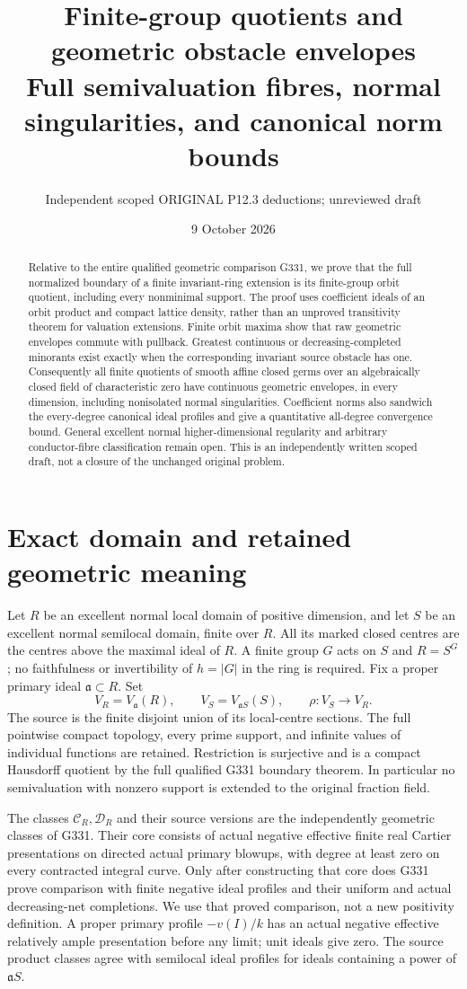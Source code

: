 \documentclass[11pt]{article}
\title{Finite-group quotients and geometric obstacle envelopes\\
Full semivaluation fibres, normal singularities, and canonical norm bounds}
\author{Independent scoped ORIGINAL P12.3 deductions; unreviewed draft}
\date{9 October 2026}
\newcommand{\C}{\mathcal C}
\newcommand{\D}{\mathcal D}
\newcommand{\aideal}{\mathfrak a}
\begin{document}
\maketitle
\begin{abstract}
Relative to the entire qualified geometric comparison G331, we prove
that the full normalized boundary of a finite invariant-ring extension
is its finite-group orbit quotient, including every nonminimal support.
The proof uses coefficient ideals of an orbit product and compact lattice
density, rather than an unproved transitivity theorem for valuation
extensions. Finite orbit maxima show that raw geometric envelopes commute
with pullback. Greatest continuous or decreasing-completed minorants exist
exactly when the corresponding invariant source obstacle has one.
Consequently all finite quotients of smooth affine closed germs over an
algebraically closed field of characteristic zero have continuous geometric
envelopes, in every dimension, including nonisolated normal singularities.
Coefficient norms also sandwich the every-degree canonical ideal profiles
and give a quantitative all-degree convergence bound. General excellent
normal higher-dimensional regularity and arbitrary conductor-fibre
classification remain open. This is an independently written scoped draft,
not a closure of the unchanged original problem.
\end{abstract}

\section{Exact domain and retained geometric meaning}
Let $R$ be an excellent normal local domain of positive dimension, and
let $S$ be an excellent normal semilocal domain, finite over $R$.
All its marked closed centres are the centres above the maximal ideal
of $R$. A finite group $G$ acts on $S$ and $R=S^G$; no faithfulness
or invertibility of $h=|G|$ in the ring is required. Fix a proper primary
ideal $\aideal\subset R$. Set
\[
 V_R=V_{\aideal}(R),\qquad V_S=V_{\aideal S}(S),\qquad
 \rho:V_S\longrightarrow V_R.
\]
The source is the finite disjoint union of its local-centre sections.
The full pointwise compact topology, every prime support, and infinite
values of individual functions are retained. Restriction is surjective
and is a compact Hausdorff quotient by the full qualified G331 boundary
theorem. In particular no semivaluation with nonzero support is extended
to the original fraction field.

The classes $\C_R,\D_R$ and their source versions are the independently
geometric classes of G331. Their core consists of actual negative
effective finite real Cartier presentations on directed actual primary
blowups, with degree at least zero on every contracted integral curve.
Only after constructing that core does G331 prove comparison with finite
negative ideal profiles and their uniform and actual decreasing-net
completions. We use that proved comparison, not a new positivity
definition. A proper primary profile $-v(I)/k$ has an actual negative
effective relatively ample presentation before any limit; unit ideals
give zero. The source product classes agree with semilocal ideal profiles
for ideals containing a power of $\aideal S$.
\end{document}
